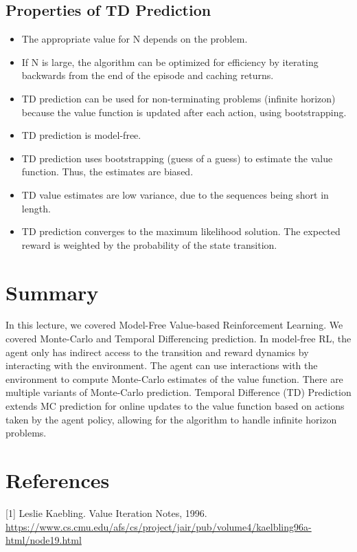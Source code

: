 \documentclass[11pt]{article}
\begin{document}
\subsection{Properties of TD Prediction}
\begin{itemize}
    \item The appropriate value for N depends on the problem.
    \item If N is large, the algorithm can be optimized for efficiency by iterating backwards from the end of the episode and caching returns.
    \item TD prediction can be used for non-terminating problems (infinite horizon) because the value function is updated after each action, using bootstrapping.
    \item TD prediction is model-free.
    \item TD prediction uses bootstrapping (guess of a guess) to estimate the value function. Thus, the estimates are biased.
    \item TD value estimates are low variance, due to the sequences being short in length. 
    \item TD prediction converges to the maximum likelihood solution. The expected reward is weighted by the probability of the state transition. 
\end{itemize}


\section{Summary}
In this lecture, we covered Model-Free Value-based Reinforcement Learning. We covered Monte-Carlo and Temporal Differencing prediction. In model-free RL, the agent only has indirect access to the transition and reward dynamics by interacting with the environment. The agent can use interactions with the environment to compute Monte-Carlo estimates of the value function. There are multiple variants of Monte-Carlo prediction. Temporal Difference (TD) Prediction extends MC prediction for online updates to the value function based on actions taken by the agent policy, allowing for the algorithm to handle infinite horizon problems.


\section*{References}
[1] Leslie Kaebling. Value Iteration Notes, 1996. \url{https://www.cs.cmu.edu/afs/cs/project/jair/pub/volume4/kaelbling96a-html/node19.html}
\end{document}
